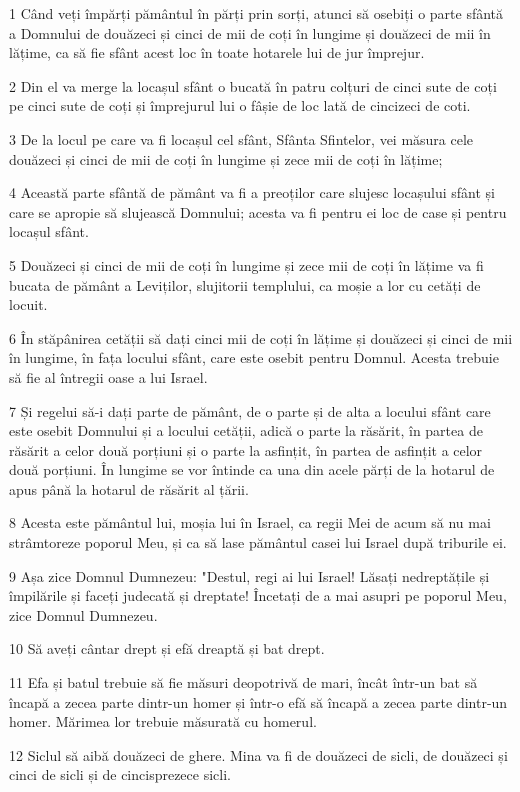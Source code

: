\par 1 Când veți împărți pământul în părți prin sorți, atunci să osebiți o parte sfântă a Domnului de douăzeci și cinci de mii de coți în lungime și douăzeci de mii în lățime, ca să fie sfânt acest loc în toate hotarele lui de jur împrejur.
\par 2 Din el va merge la locașul sfânt o bucată în patru colțuri de cinci sute de coți pe cinci sute de coți și împrejurul lui o fâșie de loc lată de cincizeci de coti.
\par 3 De la locul pe care va fi locașul cel sfânt, Sfânta Sfintelor, vei măsura cele douăzeci și cinci de mii de coți în lungime și zece mii de coți în lățime;
\par 4 Această parte sfântă de pământ va fi a preoților care slujesc locașului sfânt și care se apropie să slujească Domnului; acesta va fi pentru ei loc de case și pentru locașul sfânt.
\par 5 Douăzeci și cinci de mii de coți în lungime și zece mii de coți în lățime va fi bucata de pământ a Leviților, slujitorii templului, ca moșie a lor cu cetăți de locuit.
\par 6 În stăpânirea cetății să dați cinci mii de coți în lățime și douăzeci și cinci de mii în lungime, în fața locului sfânt, care este osebit pentru Domnul. Acesta trebuie să fie al întregii oase a lui Israel.
\par 7 Și regelui să-i dați parte de pământ, de o parte și de alta a locului sfânt care este osebit Domnului și a locului cetății, adică o parte la răsărit, în partea de răsărit a celor două porțiuni și o parte la asfințit, în partea de asfințit a celor două porțiuni. În lungime se vor întinde ca una din acele părți de la hotarul de apus până la hotarul de răsărit al țării.
\par 8 Acesta este pământul lui, moșia lui în Israel, ca regii Mei de acum să nu mai strâmtoreze poporul Meu, și ca să lase pământul casei lui Israel după triburile ei.
\par 9 Așa zice Domnul Dumnezeu: "Destul, regi ai lui Israel! Lăsați nedreptățile și împilările și faceți judecată și dreptate! Încetați de a mai asupri pe poporul Meu, zice Domnul Dumnezeu.
\par 10 Să aveți cântar drept și efă dreaptă și bat drept.
\par 11 Efa și batul trebuie să fie măsuri deopotrivă de mari, încât într-un bat să încapă a zecea parte dintr-un homer și într-o efă să încapă a zecea parte dintr-un homer. Mărimea lor trebuie măsurată cu homerul.
\par 12 Siclul să aibă douăzeci de ghere. Mina va fi de douăzeci de sicli, de douăzeci și cinci de sicli și de cincisprezece sicli.
